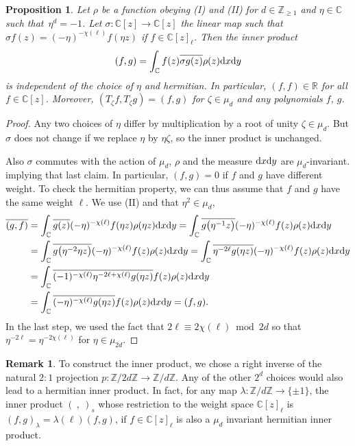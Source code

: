 \documentclass[pdftex]{sigma}
\numberwithin{equation}{section}
\newtheorem{Proposition}[Theorem]{Proposition}
\theoremstyle{definition}
\newtheorem{Remark}[Theorem]{Remark}
\begin{document}
\begin{Proposition}
 Let $\rho$ be a function obeying {\rm (I)} and {\rm (II)} for $d\in\mathbb Z_{\geq1}$ and $\eta\in\mathbb C$ such that~${\eta^d=-1}$.
 Let $\sigma\colon \mathbb C[z]\to\mathbb C[z]$ the linear map such that $\sigma f(z)=(-\eta)^{-\chi(\ell)} f(\eta z)$ if $f\in\mathbb C[z]_\ell$. Then the inner product
 \[
 (f,g)=\int_{\mathbb C}f(z)\overline{\sigma g(z)}\rho(z){\rm d}x{\rm d}y
 \]
 is independent of the choice of $\eta$ and hermitian. In particular, $(f,f)\in\mathbb R$ for all $f\in\mathbb C[z]$.
 Moreover, $(T_\zeta f,T_\zeta g)=(f,g)$ for $\zeta\in\mu_d$ and any polynomials $f$, $g$.
\end{Proposition}
\begin{proof}
 Any two choices of $\eta$ differ by multiplication by a root of unity $\zeta\in\mu_d$. But $\sigma$ does not change if we replace $\eta$ by $\eta\zeta$, so the inner product is unchanged.

 Also $\sigma$ commutes with the action of $\mu_d$, $\rho$ and the measure ${\rm d}x{\rm d}y$ are $\mu_d$-invariant. implying that last claim. In particular, $(f,g)=0$ if $f$ and $g$ have different weight.
 To check the hermitian property, we can thus assume that $f$ and $g$ have the same weight $\ell$.
 We use (II) and that $\eta^2\in\mu_d$,
 \begin{align*}
 \overline{(g,f)}&=\int_{\mathbb C}\overline{g(z)}(-\eta)^{-\chi(\ell)}f(\eta z)\rho(\eta z){\rm d}x{\rm d}y
 =\int_{\mathbb C}\overline{g\big(\eta^{-1} z\big)}(-\eta)^{-\chi(\ell)}f(z)\rho(z){\rm d}x{\rm d}y
 \\
 &=\int_{\mathbb C}\overline{g\big(\eta^{-2}\eta z\big)}(-\eta)^{-\chi(\ell)}f(z)\rho(z){\rm d}x{\rm d}y
 =\int_{\mathbb C}\overline{\eta^{-2\ell}g(\eta z)}(-\eta)^{-\chi(\ell)}f(z)\rho(z){\rm d}x{\rm d}y
 \\
 &=\int_{\mathbb C}\overline{(-1)^{-\chi(\ell)}\eta^{-2\ell+\chi(\ell)}g(\eta z)}f(z)\rho(z){\rm d}x{\rm d}y
 \\
 &=\int_{\mathbb C}\overline{(-\eta)^{-\chi(\ell)}g(\eta z)}f(z)\rho(z){\rm d}x{\rm d}y=(f,g).
 \end{align*}
 In the last step, we used the fact that $2\ell\equiv 2\chi(\ell)\bmod 2d$ so that $\eta^{-2\ell}=\eta^{-2\chi(\ell)}$
 for $\eta\in\mu_{2d}$.
\end{proof}

\begin{Remark}
 To construct the inner product, we chose a right inverse of the natural $2:1$ projection $p\colon \mathbb Z/2d\mathbb Z\to \mathbb Z/d\mathbb Z$. Any of the other $2^d$ choices would also lead to a hermitian inner product. In fact, for any map $\lambda\colon\mathbb Z/d\mathbb Z\to\{\pm1\}$, the inner product $(\ ,\ )_s$ whose restriction to the weight space $\mathbb C[z]_\ell$ is
 $
 (f,g)_\lambda=\lambda(\ell)(f,g)$, if $f\in \mathbb C[z]_\ell$
 is also a $\mu_d$ invariant hermitian inner product.
\end{Remark}
\end{document}
